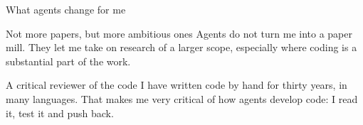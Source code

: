 \documentclass[aspectratio=169,11pt]{beamer}
\begin{document}
\begin{frame}{What agents change for me}
\begin{alertblock}{Not more papers, but more ambitious ones}
Agents do not turn me into a paper mill. They let me take on research of a larger scope, especially where coding is a substantial part of the work.
\end{alertblock}
\vspace{1em}
\begin{alertblock}{A critical reviewer of the code}
I have written code by hand for thirty years, in many languages. That makes me very critical of how agents develop code: I read it, test it and push back.
\end{alertblock}
\end{frame}
\end{document}
